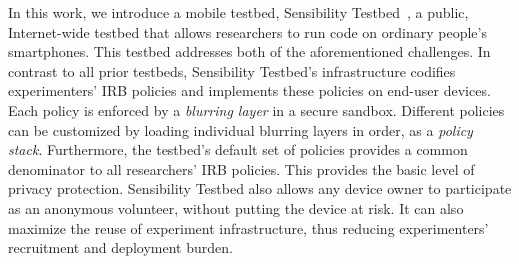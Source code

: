 In this work, we introduce a mobile testbed, 
Sensibility Testbed~\cite{sensibility, zhuang2015privacy}, a public, 
Internet-wide testbed that allows researchers to run code on ordinary
people's smartphones. This testbed addresses both of the 
aforementioned challenges.
%   
In contrast to all prior testbeds, Sensibility Testbed's
infrastructure codifies experimenters' IRB policies and 
implements these policies on end-user devices. Each 
policy is enforced by a \textit{blurring layer} in a secure 
sandbox. Different policies can be customized by loading
individual blurring layers in order, as a \textit{policy stack}. 
Furthermore, the testbed's default set of policies provides a 
common denominator to all researchers' IRB policies. This 
provides the basic level of privacy protection. 
Sensibility Testbed also allows
any device owner to participate as an anonymous volunteer,
without putting the device at risk. It can also 
maximize the reuse of experiment infrastructure, thus reducing 
experimenters' recruitment and deployment burden. 
%
%
%
%
			

